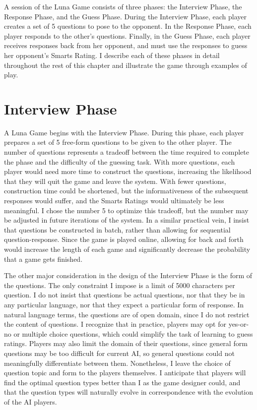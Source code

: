 A session of the Luna Game consists of three phases: the Interview Phase, the Response Phase, and the Guess Phase. During the Interview Phase, each player creates a set of 5 questions to pose to the opponent. In the Response Phase, each player responds to the other's questions. Finally, in the Guess Phase, each player receives responses back from her opponent, and must use the responses to guess her opponent's Smarts Rating. I describe each of these phases in detail throughout the rest of this chapter and illustrate the game through examples of play.

\section{Interview Phase}

A Luna Game begins with the Interview Phase. During this phase, each player prepares a set of 5 free-form questions to be given to the other player. The number of questions represents a tradeoff between the time required to complete the phase and the difficulty of the guessing task. With more questions, each player would need more time to construct the questions, increasing the likelihood that they will quit the game and leave the system. With fewer questions, construction time could be shortened, but the informativeness of the subsequent responses would suffer, and the Smarts Ratings would ultimately be less meaningful. I chose the number 5 to optimize this tradeoff, but the number may be adjusted in future iterations of the system. In a similar practical vein, I insist that questions be constructed in batch, rather than allowing for sequential question-response. Since the game is played online, allowing for back and forth would increase the length of each game and significantly decrease the probability that a game gets finished.

The other major consideration in the design of the Interview Phase is the form of the questions. The only constraint I impose is a limit of 5000 characters per question. I do not insist that questions be actual questions, nor that they be in any particular language, nor that they expect a particular form of response. In natural language terms, the questions are of open domain, since I do not restrict the content of questions. I recognize that in practice, players may opt for yes-or-no or multiple choice questions, which could simplify the task of learning to guess ratings. Players may also limit the domain of their questions, since general form questions may be too difficult for current AI, so general questions could not meaningfully differentiate between them. Nonetheless, I leave the choice of question topic and form to the players themselves. I anticipate that players will find the optimal question types better than I as the game designer could, and that the question types will naturally evolve in correspondence with the evolution of the AI players.

